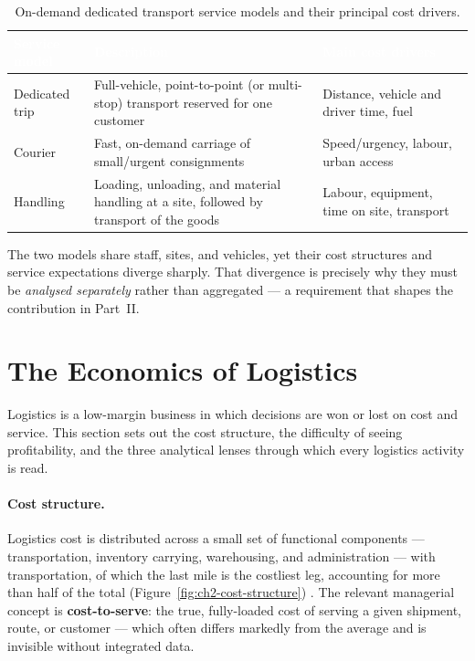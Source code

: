 \begin{table}[H]
\centering
\caption{On-demand dedicated transport service models and their principal cost drivers.}
\label{tab:ch2-transport-services}
\renewcommand{\arraystretch}{1.35}
\begin{tabularx}{\linewidth}{|>{\raggedright\arraybackslash}p{2.8cm}|>{\raggedright\arraybackslash}X|>{\raggedright\arraybackslash}X|}
\hline
\rowcolor{tblheader}
\textcolor{white}{\textbf{Service model}} &
\textcolor{white}{\textbf{Description}} &
\textcolor{white}{\textbf{Main cost drivers}} \\
\hline
Dedicated trip & Full-vehicle, point-to-point (or multi-stop) transport reserved for one customer & Distance, vehicle and driver time, fuel \\
Courier        & Fast, on-demand carriage of small/urgent consignments & Speed/urgency, labour, urban access \\
Handling       & Loading, unloading, and material handling at a site, followed by transport of the goods & Labour, equipment, time on site, transport \\
\hline
\end{tabularx}
\end{table}

\noindent The two models share staff, sites, and vehicles, yet their cost structures and service
expectations diverge sharply. That divergence is precisely why they must be \emph{analysed separately}
rather than aggregated --- a requirement that shapes the contribution in Part~II.

\section{The Economics of Logistics}
\label{sec:ch2-economics}

Logistics is a low-margin business in which decisions are won or lost on cost and service. This section
sets out the cost structure, the difficulty of seeing profitability, and the three analytical lenses
through which every logistics activity is read.

\paragraph{Cost structure.}
Logistics cost is distributed across a small set of functional components --- transportation,
inventory carrying, warehousing, and administration --- with transportation, of which the last mile
is the costliest leg, accounting for more than half of the total (Figure~\ref{fig:ch2-cost-structure})
\parencite{christopher2016, chopra2019}. The relevant managerial concept is \textbf{cost-to-serve}: the
true, fully-loaded cost of serving a given shipment, route, or customer --- which often differs
markedly from the average and is invisible without integrated data.


